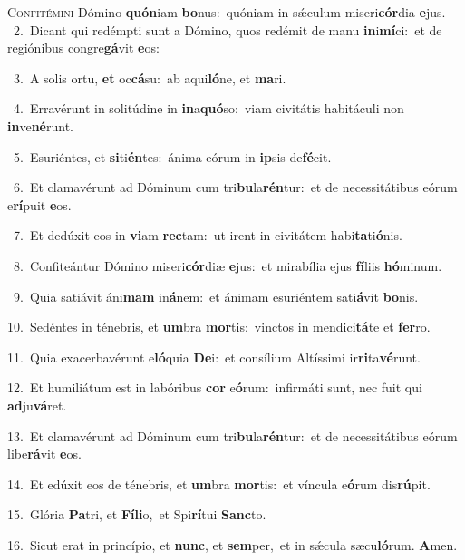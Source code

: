 \lettrine{\initial\textcolor{\initialcolor}{C}}{onfitémini} Dómino \textbf{quón}\-iam \textbf{bo}\-nus:~\star quóniam in sǽculum miseri\-\textbf{cór}\-dia \textbf{e}\-jus.\\
{\numbfont\textcolor{\numbcolor}{~2.}}~Dicant qui redémpti sunt a Dómino, quos redémit de manu \textbf{in}\-i\-\textbf{mí}\-ci:~\star et de regiónibus congre\-\textbf{gá}\-vit \textbf{e}\-os:\par
{\numbfont\textcolor{\numbcolor}{~3.}}~A solis ortu, \textbf{et} oc\-\textbf{cá}\-su:~\star ab aqui\-\textbf{ló}\-ne, et \textbf{ma}\-ri.\par
{\numbfont\textcolor{\numbcolor}{~4.}}~Erravérunt in solitúdine in \textbf{in}\-a\-\textbf{quó}\-so:~\star viam civitátis habitáculi non \textbf{in}\-ve\-\textbf{né}\-runt.\par
{\numbfont\textcolor{\numbcolor}{~5.}}~Esuriéntes, et \textbf{si}\-ti\-\textbf{én}\-tes:~\star ánima eórum in \textbf{ip}\-sis de\-\textbf{fé}\-cit.\par
{\numbfont\textcolor{\numbcolor}{~6.}}~Et clamavérunt ad Dóminum cum tri\-\textbf{bu}\-la\-\textbf{rén}\-tur:~\star et de necessitátibus eórum e\-\textbf{rí}\-puit \textbf{e}\-os.\par
{\numbfont\textcolor{\numbcolor}{~7.}}~Et dedúxit eos in \textbf{vi}\-am \textbf{rec}\-tam:~\star ut irent in civitátem habi\-\textbf{ta}\-ti\-\textbf{ó}\-nis.\par
{\numbfont\textcolor{\numbcolor}{~8.}}~Confiteántur Dómino miseri\-\textbf{cór}\-diæ \textbf{e}\-jus:~\star et mirabília ejus \textbf{fí}\-liis \textbf{hó}\-minum.\par
{\numbfont\textcolor{\numbcolor}{~9.}}~Quia satiávit áni\textbf{mam} in\-\textbf{á}\-nem:~\star et ánimam esuriéntem sati\-\textbf{á}\-vit \textbf{bo}\-nis.\par
{\numbfont\textcolor{\numbcolor}{10.}}~Sedéntes in ténebris, et \textbf{um}\-bra \textbf{mor}\-tis:~\star vinctos in mendici\-\textbf{tá}\-te et \textbf{fer}\-ro.\par
{\numbfont\textcolor{\numbcolor}{11.}}~Quia exacerbavérunt e\-\textbf{ló}\-quia \textbf{De}\-i:~\star et consílium Altíssimi ir\-\textbf{ri}\-ta\-\textbf{vé}\-runt.\par
{\numbfont\textcolor{\numbcolor}{12.}}~Et humiliátum est in labóribus \textbf{cor} e\-\textbf{ó}\-rum:~\star infirmáti sunt, nec fuit qui \textbf{ad}\-ju\-\textbf{vá}\-ret.\par
{\numbfont\textcolor{\numbcolor}{13.}}~Et clamavérunt ad Dóminum cum tri\-\textbf{bu}\-la\-\textbf{rén}\-tur:~\star et de necessitátibus eórum libe\-\textbf{rá}\-vit \textbf{e}\-os.\par
{\numbfont\textcolor{\numbcolor}{14.}}~Et edúxit eos de ténebris, et \textbf{um}\-bra \textbf{mor}\-tis:~\star et víncula e\-\textbf{ó}\-rum dis\-\textbf{rú}\-pit.\par
{\numbfont\textcolor{\numbcolor}{15.}}~Glória \textbf{Pa}\-tri, et \textbf{Fí}\-\textbf{li}o,~\star et Spi\-\textbf{rí}\-tui \textbf{Sanc}\-to.\par
{\numbfont\textcolor{\numbcolor}{16.}}~Sicut erat in princípio, et \textbf{nunc}\-, et \textbf{sem}\-per,~\star et in sǽcula sæcu\-\textbf{ló}\-rum. \textbf{A}\-men.\par
